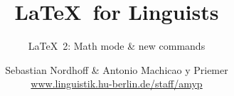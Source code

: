 


\title{
	\LaTeX\ for Linguists
}

\subtitle{\LaTeX\ 2: Math mode \& new commands}

\author[aMyP]{
	{\small Sebastian Nordhoff \& Antonio Machicao y Priemer}
	\\
	{\footnotesize \url{www.linguistik.hu-berlin.de/staff/amyp}}
}








\begin{frame}
  \HUtitle
\end{frame}





\nocite{Freitag&MyP15a}
\nocite{Knuth1986}
\nocite{Kopka94a}
\nocite{MyP17c}
\nocite{MyP&Kerkhof16a}
	


%
%
%
%
%


